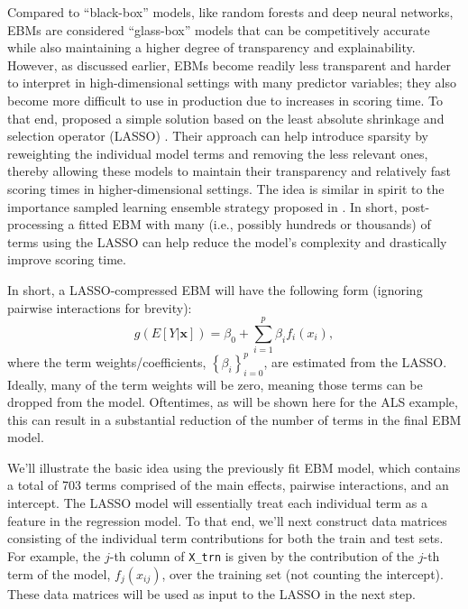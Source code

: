 Compared to ``black-box'' models, like random forests and deep neural
networks, EBMs are considered ``glass-box'' models that can be
competitively accurate while also maintaining a higher degree of
transparency and explainability. However, as discussed earlier, EBMs
become readily less transparent and harder to interpret in
high-dimensional settings with many predictor variables; they also
become more difficult to use in production due to increases in scoring
time. To that end, \citet{greenwell-2023-explainable} proposed a simple
solution based on the least absolute shrinkage and selection operator
(LASSO) \citep{tibshirani-1996-lasso}. Their approach can help introduce
sparsity by reweighting the individual model terms and removing the less
relevant ones, thereby allowing these models to maintain their
transparency and relatively fast scoring times in higher-dimensional
settings. The idea is similar in spirit to the importance sampled
learning ensemble strategy proposed in \citet{friedman-2003-importance}.
In short, post-processing a fitted EBM with many (i.e., possibly
hundreds or thousands) of terms using the LASSO can help reduce the
model's complexity and drastically improve scoring time.

In short, a LASSO-compressed EBM will have the following form (ignoring
pairwise interactions for brevity): \begin{equation}
g\left(E\left[Y|\boldsymbol{x}\right]\right) = \beta_0 + \sum_{i=1}^p \beta_if_i\left(x_i\right),
  \label{eqn:ebm}
\end{equation} where the term weights/coefficients,
\(\left\{\beta_i\right\}_{i=0}^p\), are estimated from the LASSO.
Ideally, many of the term weights will be zero, meaning those terms can
be dropped from the model. Oftentimes, as will be shown here for the ALS
example, this can result in a substantial reduction of the number of
terms in the final EBM model.

We'll illustrate the basic idea using the previously fit EBM model,
which contains a total of 703 terms comprised of the main effects,
pairwise interactions, and an intercept. The LASSO model will
essentially treat each individual term as a feature in the regression
model. To that end, we'll next construct data matrices consisting of the
individual term contributions for both the train and test sets. For
example, the \(j\)-th column of \texttt{X\_trn} is given by the
contribution of the \(j\)-th term of the model,
\(f_j\left(x_{ij}\right)\), over the training set (not counting the
intercept). These data matrices will be used as input to the LASSO in
the next step.

